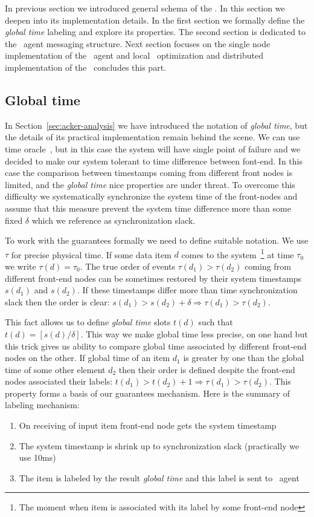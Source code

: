 \label {fs-acker-impl}

In previous section we introduced general schema of the \tracker. In this section we deepen into its implementation details. In the first section we formally define the \textit{global time} labeling and explore its properties. The second section is dedicated to the \tracker\ agent messaging structure. Next section focuses on the single node implementation of the \tracker\ agent and local \tracker\ optimization and distributed implementation of the \tracker\ concludes this part.

\subsection{Global time}
In Section~\ref{sec:acker-analysis} we have introduced the notation of \textit{global time}, but the details of its practical implementation remain behind the scene. We can use time oracle~\cite{10.14778/3055330.3055335}, but in this case the system will have single point of failure and we decided to make our system tolerant to time difference between font-end. In this case the comparison between timestamps coming from different front nodes is limited, and the \textit{global time} nice properties are under threat. To overcome this difficulty we systematically synchronize the system time of the front-nodes and assume that this measure prevent the system time difference more than some fixed $\delta$ which we reference as synchronization slack.

To work with the guarantees formally we need to define suitable notation. We use $\tau$ for precise physical time. If some data item $d$ comes to the system~\footnote{The moment when item is associated with its label by some front-end node} at time $\tau_0$ we write $\tau(d)=\tau_0$. The true order of events $\tau(d_1) > \tau(d_2)$ coming from different front-end nodes can be sometimes restored by their system timestamps $s(d_1)$ and $s(d_2)$. If these timestamps differ more than time synchronization slack then the order is clear: $s(d_1) > s(d_2) + \delta \Rightarrow \tau(d_1) > \tau(d_2)$.

This fact allows us to define \textit{global time} slots $t(d)$ such that $t(d) = [s(d) / \delta]$. This way we make global time less precise,  on one hand but this trick gives us ability to compare global time associated by different front-end nodes on the other. If global time of an item $d_1$ is greater by one than the global time of some other element $d_2$ then their order is defined despite the front-end nodes associated their labels:  $t(d_1) > t(d_2) + 1 \Rightarrow \tau(d_1) > \tau(d_2)$. This property forms a basis of our guarantees mechanism. Here is the summary of labeling mechanism:
\begin{enumerate}
    \item On receiving of input item front-end node gets the system timestamp
    \item The system timestamp is shrink up to synchronization slack (practically we use 10ms)
    \item The item is labeled by the result \textit{global time} and this label is sent to \tracker\ agent
\end{enumerate}

